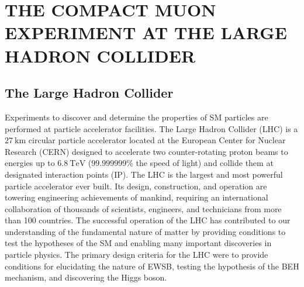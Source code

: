 
\chapter{THE COMPACT MUON EXPERIMENT AT THE LARGE HADRON COLLIDER}
\label{The_CMS_Experiment_at_the_LHC}

\section{The Large Hadron Collider}
Experiments to discover and determine the properties of SM particles are performed at particle accelerator facilities.
The Large Hadron Collider (LHC) is a $\SI{27}{\km}$ circular particle accelerator located at the European Center for Nuclear Research (CERN) designed to accelerate two counter-rotating proton beams to energies up to $\SI{6.8}{\TeV}$ ($99.999999\%$ the speed of light) and collide them at designated interaction points (IP).
The LHC is the largest and most powerful particle accelerator ever built.
Its design, construction, and operation are towering engineering achievements of mankind, requiring an international collaboration of thousands of scientists, engineers, and technicians from more than 100 countries.
The successful operation of the LHC has contributed to our understanding of the fundamental nature of matter by providing conditions to test the hypotheses of the SM and enabling many important discoveries in particle physics.
The primary design criteria for the LHC were to provide conditions for elucidating the nature of EWSB, testing the hypothesis of the BEH mechanism, and discovering the Higgs boson.

